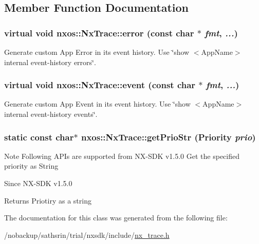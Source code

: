 \subsection{Member Function Documentation}
\hypertarget{classnxos_1_1NxTrace_afc0240b6b9a291729836ffb2fbeef8a4}{
\subsubsection[{error}]{\setlength{\rightskip}{0pt plus 5cm}virtual void nxos::NxTrace::error (const char $\ast$ {\em fmt}, \/   {\em ...})}}
\label{classnxos_1_1NxTrace_afc0240b6b9a291729836ffb2fbeef8a4}
Generate custom App Error in its event history. Use \char`\"{}show $<$AppName$>$ internal event-\/history errors\char`\"{}. \hypertarget{classnxos_1_1NxTrace_a22e5e2fff39fae68fba3051dc2720621}{
\subsubsection[{event}]{\setlength{\rightskip}{0pt plus 5cm}virtual void nxos::NxTrace::event (const char $\ast$ {\em fmt}, \/   {\em ...})}}
\label{classnxos_1_1NxTrace_a22e5e2fff39fae68fba3051dc2720621}
Generate custom App Event in its event history. Use \char`\"{}show $<$AppName$>$ internal event-\/history events\char`\"{}. \hypertarget{classnxos_1_1NxTrace_a583b8a49a2111e4e4b8ef2f2eeaa4620}{
\subsubsection[{getPrioStr}]{\setlength{\rightskip}{0pt plus 5cm}static const char$\ast$ nxos::NxTrace::getPrioStr ({\bf Priority} {\em prio})}}
\label{classnxos_1_1NxTrace_a583b8a49a2111e4e4b8ef2f2eeaa4620}
\begin{DoxyNote}{Note}
Following APIs are supported from NX-\/SDK v1.5.0 Get the specified priority as String
\end{DoxyNote}
\begin{DoxySince}{Since}
NX-\/SDK v1.5.0
\end{DoxySince}
\begin{DoxyReturn}{Returns}
Priotiry as a string 
\end{DoxyReturn}


The documentation for this class was generated from the following file:\begin{DoxyCompactItemize}
\item 
/nobackup/sathsrin/trial/nxsdk/include/\hyperlink{nx__trace_8h}{nx\_\-trace.h}\end{DoxyCompactItemize}
